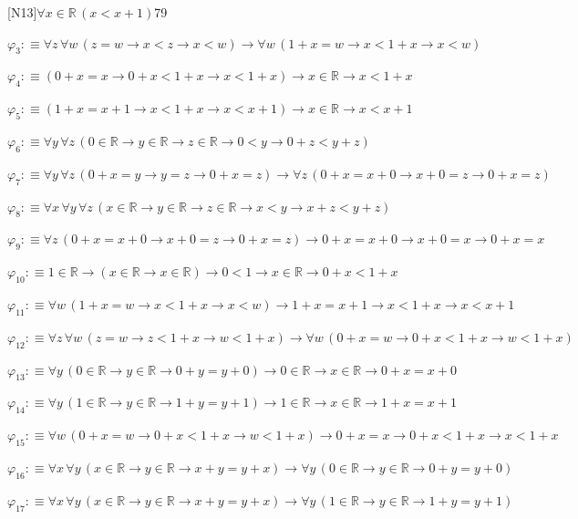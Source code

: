 \begin{fullproof}{[N13]}{$\forall x \in \mathbb{R}\,(x < x + 1)$}{79}
\begin{abbrevlist}
\item $\varphi_{3} :\equiv \forall z\,\forall w\,(z = w \to x < z \to x < w) \to \forall w\,(1 + x = w \to x < 1 + x \to x < w)$
\item $\varphi_{4} :\equiv (0 + x = x \to 0 + x < 1 + x \to x < 1 + x) \to x \in \mathbb{R} \to x < 1 + x$
\item $\varphi_{5} :\equiv (1 + x = x + 1 \to x < 1 + x \to x < x + 1) \to x \in \mathbb{R} \to x < x + 1$
\item $\varphi_{6} :\equiv \forall y\,\forall z\,(0 \in \mathbb{R} \to y \in \mathbb{R} \to z \in \mathbb{R} \to 0 < y \to 0 + z < y + z)$
\item $\varphi_{7} :\equiv \forall y\,\forall z\,(0 + x = y \to y = z \to 0 + x = z) \to \forall z\,(0 + x = x + 0 \to x + 0 = z \to 0 + x = z)$
\item $\varphi_{8} :\equiv \forall x\,\forall y\,\forall z\,(x \in \mathbb{R} \to y \in \mathbb{R} \to z \in \mathbb{R} \to x < y \to x + z < y + z)$
\item $\varphi_{9} :\equiv \forall z\,(0 + x = x + 0 \to x + 0 = z \to 0 + x = z) \to 0 + x = x + 0 \to x + 0 = x \to 0 + x = x$
\item $\varphi_{10} :\equiv 1 \in \mathbb{R} \to (x \in \mathbb{R} \to x \in \mathbb{R}) \to 0 < 1 \to x \in \mathbb{R} \to 0 + x < 1 + x$
\item $\varphi_{11} :\equiv \forall w\,(1 + x = w \to x < 1 + x \to x < w) \to 1 + x = x + 1 \to x < 1 + x \to x < x + 1$
\item $\varphi_{12} :\equiv \forall z\,\forall w\,(z = w \to z < 1 + x \to w < 1 + x) \to \forall w\,(0 + x = w \to 0 + x < 1 + x \to w < 1 + x)$
\item $\varphi_{13} :\equiv \forall y\,(0 \in \mathbb{R} \to y \in \mathbb{R} \to 0 + y = y + 0) \to 0 \in \mathbb{R} \to x \in \mathbb{R} \to 0 + x = x + 0$
\item $\varphi_{14} :\equiv \forall y\,(1 \in \mathbb{R} \to y \in \mathbb{R} \to 1 + y = y + 1) \to 1 \in \mathbb{R} \to x \in \mathbb{R} \to 1 + x = x + 1$
\item $\varphi_{15} :\equiv \forall w\,(0 + x = w \to 0 + x < 1 + x \to w < 1 + x) \to 0 + x = x \to 0 + x < 1 + x \to x < 1 + x$
\item $\varphi_{16} :\equiv \forall x\,\forall y\,(x \in \mathbb{R} \to y \in \mathbb{R} \to x + y = y + x) \to \forall y\,(0 \in \mathbb{R} \to y \in \mathbb{R} \to 0 + y = y + 0)$
\item $\varphi_{17} :\equiv \forall x\,\forall y\,(x \in \mathbb{R} \to y \in \mathbb{R} \to x + y = y + x) \to \forall y\,(1 \in \mathbb{R} \to y \in \mathbb{R} \to 1 + y = y + 1)$

\end{abbrevlist}
\end{fullproof}
